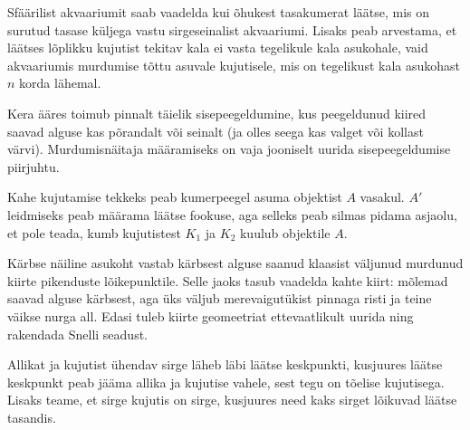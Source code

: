 \documentclass[10pt, twoside]{article}
\begin{document}
{
\hint
Sfäärilist akvaariumit saab vaadelda kui õhukest tasakumerat läätse, mis on surutud tasase küljega vastu sirgeseinalist akvaariumi. Lisaks peab arvestama, et läätses lõplikku kujutist tekitav kala ei vasta tegelikule kala asukohale, vaid akvaariumis murdumise tõttu asuvale kujutisele, mis on tegelikust kala asukohast $n$ korda lähemal.
\probend
\bigskip


\hint
Kera ääres toimub pinnalt täielik sisepeegeldumine, kus peegeldunud kiired saavad alguse kas põrandalt või seinalt (ja olles seega kas valget või kollast värvi). Murdumisnäitaja määramiseks on vaja jooniselt uurida sisepeegeldumise piirjuhtu.
\probend
\bigskip


\hint
Kahe kujutamise tekkeks peab kumerpeegel asuma objektist $A$ vasakul. $A'$ leidmiseks peab määrama läätse fookuse, aga selleks peab silmas pidama asjaolu, et pole teada, kumb kujutistest $K_1$ ja $K_2$ kuulub objektile $A$.
\probend
\bigskip


\hint
Kärbse näiline asukoht vastab kärbsest alguse saanud klaasist väljunud murdunud kiirte pikenduste lõikepunktile. Selle jaoks tasub vaadelda kahte kiirt: mõlemad saavad alguse kärbsest, aga üks väljub merevaigutükist pinnaga risti ja teine väikse nurga all. Edasi tuleb kiirte geomeetriat ettevaatlikult uurida ning rakendada Snelli seadust.
\probend
\bigskip


\hint
Allikat ja kujutist ühendav sirge läheb läbi läätse keskpunkti, kusjuures läätse keskpunkt peab jääma allika ja kujutise vahele, sest tegu on tõelise kujutisega. Lisaks teame, et sirge kujutis on sirge, kusjuures need kaks sirget lõikuvad läätse tasandis.
\probend
\bigskip


}
\end{document}

